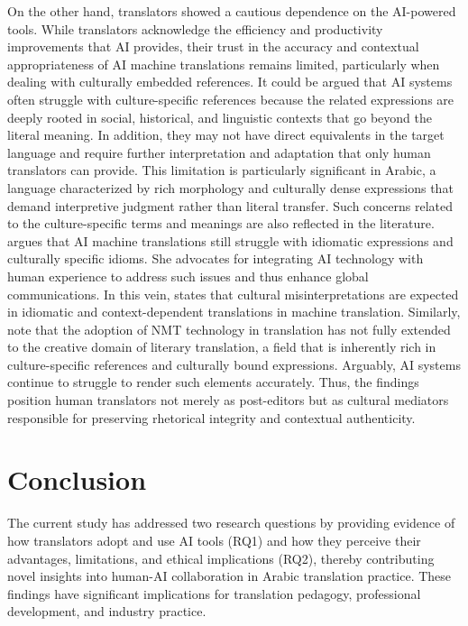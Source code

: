 \documentclass[english]{textolivre}
\begin{document}
On the other hand, translators showed a cautious dependence on the AI-powered tools. While translators acknowledge the efficiency and productivity improvements that AI provides, their trust in the accuracy and contextual appropriateness of AI machine translations remains limited, particularly when dealing with culturally embedded references. It could be argued that AI systems often struggle with culture-specific references because the related expressions are deeply rooted in social, historical, and linguistic contexts that go beyond the literal meaning. In addition, they may not have direct equivalents in the target language and require further interpretation and adaptation that only human translators can provide. This limitation is particularly significant in Arabic, a language characterized by rich morphology and culturally dense expressions that demand interpretive judgment rather than literal transfer. Such concerns related to the culture-specific terms and meanings are also reflected in the literature. \textcite{Shahmerdanova2025AITranslation} argues that AI machine translations still struggle with idiomatic expressions and culturally specific idioms. She advocates for integrating AI technology with human experience to address such issues and thus enhance global communications. In this vein, \textcite{AlMaaytah2026EvaluatingNMT} states that cultural misinterpretations are expected in idiomatic and context-dependent translations in machine translation. Similarly, \textcite{CorpasPastorNoriegaSantianez2024Creativity} note that the adoption of NMT technology in translation has not fully extended to the creative domain of literary translation, a field that is inherently rich in culture-specific references and culturally bound expressions. Arguably, AI systems continue to struggle to render such elements accurately. Thus, the findings position human translators not merely as post-editors but as cultural mediators responsible for preserving rhetorical integrity and contextual authenticity.


\section{Conclusion}\label{sec-listas}
The current study has addressed two research questions by providing evidence of how translators adopt and use AI tools (RQ1) and how they perceive their advantages, limitations, and ethical implications (RQ2), thereby contributing novel insights into human-AI collaboration in Arabic translation practice. These findings have significant implications for translation pedagogy, professional development, and industry practice.
\end{document}
